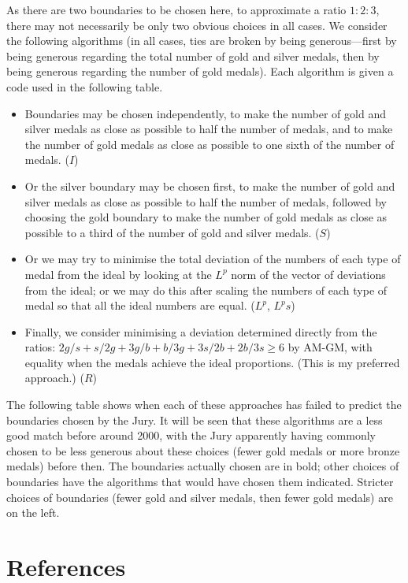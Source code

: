 \documentclass[a4paper,11pt]{article}
\begin{document}
As there are two boundaries to be chosen here, to approximate a ratio
$1:2:3$, there may not necessarily be only two obvious choices in all
cases.  We consider the following algorithms (in all cases, ties are
broken by being generous---first by being generous regarding the total
number of gold and silver medals, then by being generous regarding the
number of gold medals).  Each algorithm is given a code used in the
following table.

\begin{itemize}
\item Boundaries may be chosen independently, to make the number of
  gold and silver medals as close as possible to half the number of
  medals, and to make the number of gold medals as close as possible
  to one sixth of the number of medals.  ($I$)
\item Or the silver boundary may be chosen first, to make the number
  of gold and silver medals as close as possible to half the number of
  medals, followed by choosing the gold boundary to make the number of
  gold medals as close as possible to a third of the number of gold
  and silver medals.  ($S$)
\item Or we may try to minimise the total deviation of the numbers of
  each type of medal from the ideal by looking at the $L^p$ norm of
  the vector of deviations from the ideal; or we may do this after
  scaling the numbers of each type of medal so that all the ideal
  numbers are equal.  ($L^p$, $L^ps$)
\item Finally, we consider minimising a deviation determined directly
  from the ratios: $2g/s + s/2g + 3g/b + b/3g + 3s/2b + 2b/3s \ge 6$
  by AM-GM, with equality when the medals achieve the ideal
  proportions.  (This is my preferred approach.)  ($R$)
\end{itemize}

The following table shows when each of these
approaches has failed to predict the boundaries chosen by the Jury.
It will be seen that these algorithms are a less good match before
around 2000, with the Jury apparently having commonly chosen to be
less generous about these choices (fewer gold medals or more bronze
medals) before then.  The boundaries actually chosen are in bold;
other choices of boundaries have the algorithms that would have chosen
them indicated.  Stricter choices of boundaries (fewer gold and silver
medals, then fewer gold medals) are on the left.



\section*{References}
\end{document}
